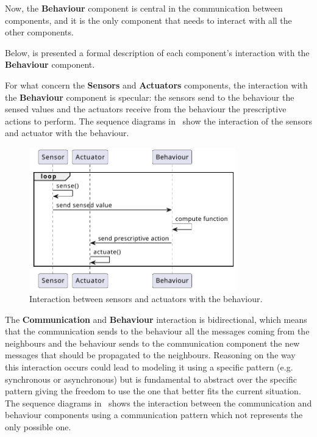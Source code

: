 Now, the \textbf{Behaviour} component is central in the communication between components, and it is the only component that needs to interact with all the other components.

Below, is presented a formal description of each component's interaction with the \textbf{Behaviour} component.

For what concern the \textbf{Sensors} and \textbf{Actuators} components, the interaction with the \textbf{Behaviour} component is specular: the
sensors send to the behaviour the sensed values and the actuators receive from the behaviour the prescriptive actions to perform.
The sequence diagrams in~ show the interaction of the sensors and actuator with the
behaviour.

\begin{figure}
	\centering
	\includegraphics[width=0.8\textwidth]{figures/sequence-diagram-sense-act.pdf}
	\caption{Interaction between sensors and actuators with the behaviour.}
	\label{fig:framework-components-interaction-2-sensors-actuators}
\end{figure}

The \textbf{Communication} and \textbf{Behaviour} interaction is bidirectional, which means that the communication sends to the behaviour all the
messages coming from the neighbours and the behaviour sends to the communication component the new messages that should be propagated
to the neighbours.
Reasoning on the way this interaction occurs could lead to modeling it using a specific pattern (e.g. synchronous or asynchronous) but is fundamental
to abstract over the specific pattern giving the freedom to use the one that better fits the current situation.
The sequence diagrams in~ shows the interaction between the communication and
behaviour components using a communication pattern which not represents the only possible one.

